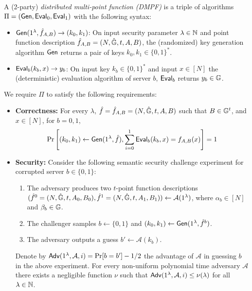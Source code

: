 \begin{definition}[DMPF]\label{def:dmpf}
  A 
  (2-party)
  \emph{distributed multi-point function (DMPF)}
  is a triple of algorithms %
  $\Pi=({\sf Gen},{\sf Eval}_0,{\sf Eval}_1)$
  with the following syntax: 
  \begin{itemize}
      \item ${\sf Gen}(1^\lambda,\hat{f}_{A,B})\rightarrow (k_0,k_1)$: On input security parameter $\lambda\in\mathbb{N}$ and point function description $\hat{f}_{A,B}=(N,\hat{\mathbb{G}},t,A,B)$, the (randomized) key generation algorithm ${\sf Gen}$ returns a pair of keys $k_0,k_1\in\{0,1\}^*$. 
      \item ${\sf Eval}_b(k_b,x)\rightarrow y_b$: On input key $k_b\in\{0,1\}^*$ and input $x\in[N]$ the (deterministic) evaluation algorithm of server $b$, ${\sf Eval}_b$ returns $y_b\in\mathbb{G}$.
  \end{itemize}
  We require $\Pi$ to satisfy the following requirements:
  \begin{itemize}
      \item \textbf{Correctness:} For every $\lambda$, $\hat{f}=\hat{f}_{A,B}=(N,\hat{\mathbb{G}},t,A,B)$ such that $B\in\mathbb{G}^t$, and $x\in[N]$, for $b=0,1$,
      $$\Pr\left[(k_0,k_1)\leftarrow{\sf Gen}(1^\lambda,\hat{f}), \sum_{i=0}^{1}{\sf Eval}_b(k_b,x)=f_{A,B}(x)\right]=1$$
      \item \textbf{Security:} Consider the following semantic security challenge experiment for corrupted server $b\in\{0,1\}$:
      \begin{enumerate}
          \item The adversary produces two $t$-point function descriptions $(\hat{f}^0=(N,\hat{\mathbb{G}},t,A_0,B_0),\hat{f}^1=(N,\hat{\mathbb{G}},t,A_1,B_1))\leftarrow\mathcal{A}(1^\lambda)$, where $\alpha_b\in[N]$ and $\beta_b\in\mathbb{G}$.
          \item The challenger samples $b\gets\{0,1\}$ and $(k_0,k_1)\leftarrow{\sf Gen}(1^\lambda,\hat{f}^b)$.
          \item The adversary outputs a guess $b'\leftarrow\mathcal{A}(k_b)$.
      \end{enumerate}
      Denote by ${\sf Adv}(1^\lambda,\mathcal{A},i)=\Pr[b=b']-1/2$ the advantage of $\mathcal{A}$ in guessing $b$ in the above experiment. For every non-uniform polynomial time adversary $\mathcal{A}$ there exists a negligible function $\nu$ such that ${\sf Adv}(1^\lambda,\mathcal{A},i) \le \nu(\lambda)$ for all $\lambda \in \mathbb{N}$.
  \end{itemize}
  \end{definition}
 
